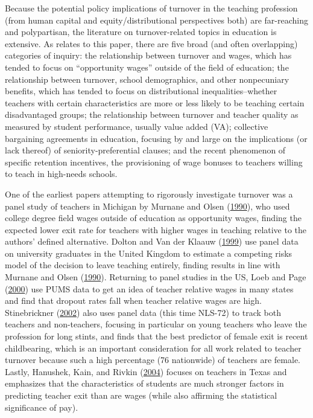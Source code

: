 \documentclass[12pt,]{article}
\begin{document}
Because the potential policy implications of turnover in the teaching
profession (from human capital and equity/distributional perspectives
both) are far-reaching and polypartisan, the literature on
turnover-related topics in education is extensive. As relates to this
paper, there are five broad (and often overlapping) categories of
inquiry: the relationship between turnover and wages, which has tended
to focus on ``opportunity wages'' outside of the field of education; the
relationship between turnover, school demographics, and other
nonpecuniary benefits, which has tended to focus on distributional
inequalities--whether teachers with certain characteristics are more or
less likely to be teaching certain disadvantaged groups; the
relationship between turnover and teacher quality as measured by student
performance, usually value added (VA); collective bargaining agreements
in education, focusing by and large on the implications (or lack
thereof) of seniority-preferential clauses; and the recent phenomenon of
specific retention incentives, the provisioning of wage bonuses to
teachers willing to teach in high-needs schools.

One of the earliest papers attempting to rigorously investigate turnover
was a panel study of teachers in Michigan by Murnane and Olsen
(\protect\hyperlink{ref-murnane}{1990}), who used college degree field
wages outside of education as opportunity wages, finding the expected
lower exit rate for teachers with higher wages in teaching relative to
the authors' defined alternative. Dolton and Van der Klaauw
(\protect\hyperlink{ref-dolton}{1999}) use panel data on university
graduates in the United Kingdom to estimate a competing risks model of
the decision to leave teaching entirely, finding results in line with
Murnane and Olsen (\protect\hyperlink{ref-murnane}{1990}). Returning to
panel studies in the US, Loeb and Page
(\protect\hyperlink{ref-loeb}{2000}) use PUMS data to get an idea of
teacher relative wages in many states and find that dropout rates fall
when teacher relative wages are high. Stinebrickner
(\protect\hyperlink{ref-stinebrickner}{2002}) also uses panel data (this
time NLS-72) to track both teachers and non-teachers, focusing in
particular on young teachers who leave the profession for long stints,
and finds that the best predictor of female exit is recent childbearing,
which is an important consideration for all work related to teacher
turnover because such a high percentage (76 nationwide) of teachers are
female. Lastly, Hanushek, Kain, and Rivkin
(\protect\hyperlink{ref-hanushek}{2004}) focuses on teachers in Texas
and emphasizes that the characteristics of students are much stronger
factors in predicting teacher exit than are wages (while also affirming
the statistical significance of pay).
\end{document}
